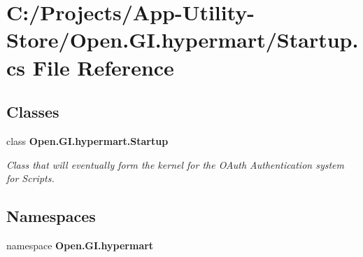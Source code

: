 \section{C\+:/\+Projects/\+App-\/\+Utility-\/\+Store/\+Open.G\+I.\+hypermart/\+Startup.cs File Reference}
\label{_startup_8cs}
\subsection*{Classes}
\begin{DoxyCompactItemize}
\item 
class \textbf{ Open.\+G\+I.\+hypermart.\+Startup}
\begin{DoxyCompactList}\small\item\em Class that will eventually form the kernel for the O\+Auth Authentication system for Scripts. \end{DoxyCompactList}\end{DoxyCompactItemize}
\subsection*{Namespaces}
\begin{DoxyCompactItemize}
\item 
namespace \textbf{ Open.\+G\+I.\+hypermart}
\end{DoxyCompactItemize}
